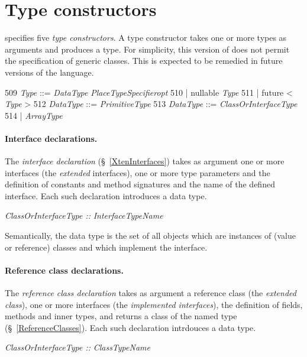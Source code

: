 \section{Type constructors}\label{TypeConstructors}

{}\Xten{} specifies five {\em type constructors}.  A type constructor
takes one or more types as arguments and produces a type. For
simplicity, this version of \Xten{} does not permit the specification
of generic classes. This is expected to be remedied in future versions
of the language.


\begin{x10}

509   {\em Type} ::= {\em DataType} {\em PlaceTypeSpecifieropt}
510          | nullable {\em Type}
511          | future < {\em Type} > 
512   {\em DataType} ::= {\em PrimitiveType}
513   {\em DataType} ::= {\em ClassOrInterfaceType}
514              | {\em ArrayType}
\end{x10}


\paragraph{Interface declarations.}
The {\em interface declaration} (\S~\ref{XtenInterfaces}) takes as
argument one or more interfaces (the {\em extended} interfaces), one
or more type parameters and the definition of constants and method
signatures and the name of the defined interface.  Each such
declaration introduces a data type.

\begin{x10}
{\em ClassOrInterfaceType ::}
   {\em{}InterfaceTypeName} 
\end{x10}

Semantically, the data type is the set of all objects which are
instances of (value or reference) classes and which implement the
interface.


\paragraph{Reference class declarations.}\label{ReferenceTypes}
The {\em reference class declaration} takes as argument a reference
class (the {\em extended class}), one or more interfaces (the {\em
implemented interfaces}), the definition of fields, methods and inner
types, and returns a class of the named type
(\S~\ref{ReferenceClasses}). Each such declaration intrdouces a data
type.

\begin{x10}
{\em ClassOrInterfaceType ::}
   {\em{}ClassTypeName} 
\end{x10}

